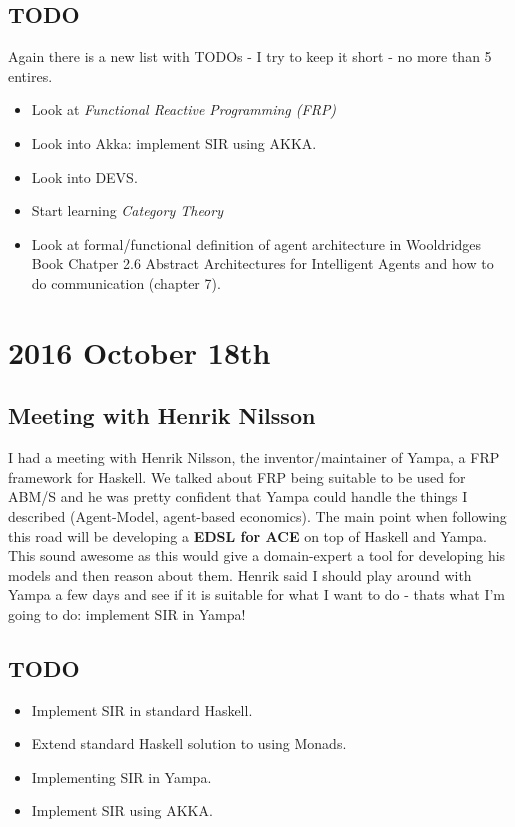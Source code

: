 \subsection*{TODO}
Again there is a new list with TODOs - I try to keep it short - no more than 5 entires.
\begin{itemize}
\item Look at \textit{Functional Reactive Programming (FRP)}
\item Look into Akka: implement SIR using AKKA.
\item Look into DEVS.
\item Start learning \textit{Category Theory}
\item Look at formal/functional definition of agent architecture in Wooldridges Book Chatper 2.6 Abstract Architectures for Intelligent Agents and how to do communication (chapter 7).
\end{itemize}

\section*{2016 October 18th}
\subsection*{Meeting with Henrik Nilsson}
I had a meeting with Henrik Nilsson, the inventor/maintainer of Yampa, a FRP framework for Haskell. We talked about FRP being suitable to be used for ABM/S and he was pretty confident that Yampa could handle the things I described (Agent-Model, agent-based economics). The main point when following this road will be developing a \textbf{EDSL for ACE} on top of Haskell and Yampa. This sound awesome as this would give a domain-expert a tool for developing his models and then reason about them. Henrik said I should play around with Yampa a few days and see if it is suitable for what I want to do - thats what I'm going to do: implement SIR in Yampa!


\subsection*{TODO}
\begin{itemize}
\item Implement SIR in standard Haskell.
\item Extend standard Haskell solution to using Monads.
\item Implementing SIR in Yampa.
\item Implement SIR using AKKA.
\end{itemize}